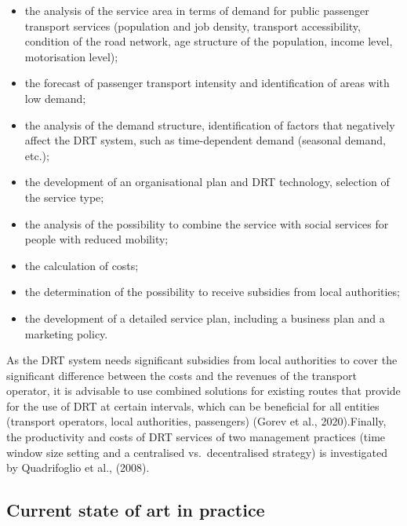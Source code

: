 \documentclass[
]{book}
\providecommand{\tightlist}{%
  \setlength{\itemsep}{0pt}\setlength{\parskip}{0pt}}
\begin{document}
\begin{itemize}
\tightlist
\item
  the analysis of the service area in terms of demand for public passenger transport services (population and job density, transport accessibility, condition of the road network, age structure of the population, income level, motorisation level);
\item
  the forecast of passenger transport intensity and identification of areas with low demand;
\item
  the analysis of the demand structure, identification of factors that negatively affect the DRT system, such as time-dependent demand (seasonal demand, etc.);
\item
  the development of an organisational plan and DRT technology, selection of the service type;
\item
  the analysis of the possibility to combine the service with social services for people with reduced mobility;
\item
  the calculation of costs;
\item
  the determination of the possibility to receive subsidies from local authorities;
\item
  the development of a detailed service plan, including a business plan and a marketing policy.
\end{itemize}

As the DRT system needs significant subsidies from local authorities to cover the significant difference between the costs and the revenues of the transport operator, it is advisable to use combined solutions for existing routes that provide for the use of DRT at certain intervals, which can be beneficial for all entities (transport operators, local authorities, passengers) (Gorev et al., 2020).Finally, the productivity and costs of DRT services of two management practices (time window size setting and a centralised vs.~decentralised strategy) is investigated by Quadrifoglio et al., (2008).

\hypertarget{current-state-of-art-in-practice-36}{%
\subsection*{Current state of art in practice}\label{current-state-of-art-in-practice-36}}
\end{document}
